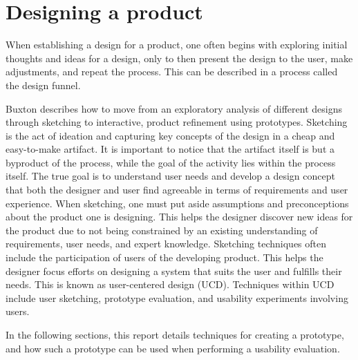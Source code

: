 \section{Designing a product} %
When establishing a design for a product, one often begins with exploring initial thoughts and ideas for a design, only to then present the design to the user, make adjustments, and repeat the process. 
This can be described in a process called the design funnel.\cite{BUXTON2007135_skething}

Buxton\cite{BUXTON2007135_skething,BUXTON2007139_prototyping} describes how to move from an exploratory analysis of different designs through sketching to interactive, product refinement using prototypes. 
Sketching is the act of ideation and capturing key concepts of the design in a cheap and easy-to-make artifact. 
It is important to notice that the artifact itself is but a byproduct of the process, while the goal of the activity lies within the process itself.\cite{BUXTON2007135_skething}
The true goal is to understand user needs and develop a design concept that both the designer and user find agreeable in terms of requirements and user experience. 
When sketching, one must put aside assumptions and preconceptions about the product one is designing.
This helps the designer discover new ideas for the product due to not being constrained by an existing understanding of requirements, user needs, and expert knowledge. %
Sketching techniques often include the participation of users of the developing product.
This helps the designer focus efforts on designing a system that suits the user and fulfills their needs.
This is known as user-centered design (UCD). \cite{user-centred-design}
Techniques within UCD include user sketching, prototype evaluation, and usability experiments involving users.

In the following sections, this report details techniques for creating a prototype, and how such a prototype can be used when performing a usability evaluation.